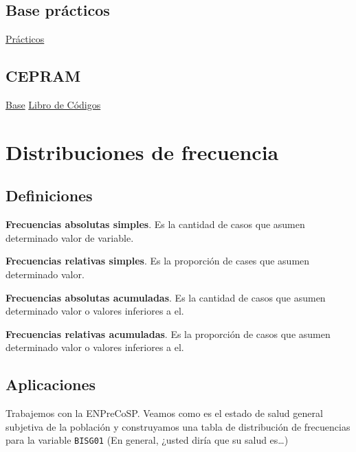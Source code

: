 \documentclass[spanish,]{book}
\newenvironment{Shaded}{\begin{snugshade}}{\end{snugshade}}
\newcommand{\KeywordTok}[1]{\textcolor[rgb]{0.13,0.29,0.53}{\textbf{#1}}}
\newcommand{\StringTok}[1]{\textcolor[rgb]{0.31,0.60,0.02}{#1}}
\newcommand{\OperatorTok}[1]{\textcolor[rgb]{0.81,0.36,0.00}{\textbf{#1}}}
\newcommand{\NormalTok}[1]{#1}
\begin{document}
\section{Base prácticos}\label{base-practicos}

\href{data/base2019.txt}{Prácticos}

\section{CEPRAM}\label{cepram}

\href{data/cepram.csv}{Base}
\href{data/cuestionario/CEPRAM_libro_codigo.pdf}{Libro de Códigos}

\chapter{Distribuciones de frecuencia}\label{frec}

\section{Definiciones}\label{definiciones}

\textbf{Frecuencias absolutas simples}. Es la cantidad de casos que
asumen determinado valor de variable.

\textbf{Frecuencias relativas simples}. Es la proporción de cases que
asumen determinado valor.

\textbf{Frecuencias absolutas acumuladas}. Es la cantidad de casos que
asumen determinado valor o valores inferiores a el.

\textbf{Frecuencias relativas acumuladas}. Es la proporción de casos que
asumen determinado valor o valores inferiores a el.

\section{Aplicaciones}\label{aplicaciones}

Trabajemos con la ENPreCoSP. Veamos como es el estado de salud general
subjetiva de la población y construyamos una tabla de distribución de
frecuencias para la variable \texttt{BISG01} (En general, ¿usted diría
que su salud es\ldots{})

\begin{Shaded}
\end{Shaded}
\end{document}

